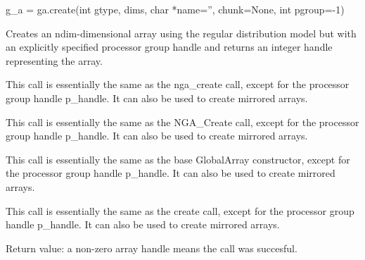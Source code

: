 \documentclass[12pt]{article}
\begin{document}
\begin{pyapi}
\begin{pycode}
g_a = ga.create(int gtype, dims, char *name='', chunk=None,
                int pgroup=-1)
\end{pycode}
\begin{funcargs}
\end{funcargs}
\end{pyapi}

\dcoll

\begin{desc}

Creates an ndim-dimensional array using the regular distribution model but with
an explicitly specified processor group handle and returns an integer handle
representing the array.
\end{desc}

\begin{fdesc}
This call is essentially the same as the nga_create call, except for the
processor group handle p_handle. It can also be used to create mirrored arrays.
\end{fdesc}

\begin{cdesc}
This call is essentially the same as the NGA_Create call, except for the
processor group handle p_handle. It can also be used to create mirrored arrays.
\end{cdesc}

\begin{cxxdesc}
This call is essentially the same as the base GlobalArray constructor, except
for the processor group handle p_handle. It can also be used to create mirrored
arrays.
\end{cxxdesc}

\begin{pydesc}
This call is essentially the same as the create call, except for the
processor group handle p_handle. It can also be used to create mirrored arrays.
\end{pydesc}

\begin{desc}
Return value: a non-zero array handle means the call was succesful.

\end{desc}
\end{document}
